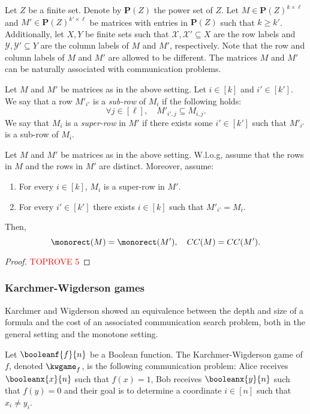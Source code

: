 \documentclass[acmsmall, nonacm, authorversion]{acmart}
\begin{document}
Let $Z$ be a finite set. Denote by $\mathbf{P}(Z)$ the power set of $Z$. Let $M\in \mathbf{P}(Z)^{k\times \ell}$ and $M'\in \mathbf{P}(Z)^{k'\times \ell}$ be matrices with entries in $\mathbf{P}(Z)$ such that $k\ge k'$. Additionally, let $X,Y$ be finite sets such that $\mathcal{X}, \mathcal{X}'\subseteq X$ are the row labels and $\mathcal{Y}, \mathcal{Y}'\subseteq Y$ are the column labels of $M$ and $M'$, respectively. Note that the row and column labels of $M$ and $M'$ are allowed to be different.
The matrices $M$ and $M'$ can be naturally associated with communication problems. 

\begin{definition}\label{def:sub-row-super-row}
Let $M$ and $M'$ be matrices as in the above setting. Let $i\in[k]$ and $i'\in[k']$. We say that a row $M'_{i'}$ is a \emph{sub-row} of $M_i$ if the following holds:
\[
\forall j\in [\ell], \quad M'_{i',j}\subseteq M_{i,j}.
\]
We say that $M_i$ is a \emph{super-row} in $M'$ if there exists some $i'\in[k']$ such that $M'_{i'}$ is a sub-row of $M_i$.
\end{definition}

\begin{lemma}\label{lem:simplification-lemma}
Let $M$ and $M'$ be matrices as in the above setting. W.l.o.g, assume that the rows in $M$ and the rows in $M'$ are distinct. Moreover, assume:
\begin{enumerate}
    \item For every $i\in[k]$, $M_i$ is a super-row in $M'$. \label{item:1}
    \item For every $i'\in [k']$ there exists $i\in [k]$ such that $M'_{i'}=M_{i}$. \label{item:2}
\end{enumerate}
Then, 
\[
\monorect(M)=\monorect(M'), \quad CC(M)=CC(M').
\]
\end{lemma}
\begin{proof}\textcolor{red}{TOPROVE 5}\end{proof}

\subsubsection{Karchmer-Wigderson games}\label{subsec:kw-games}
Karchmer and Wigderson \cite{KW90} showed an equivalence between the depth and size of a formula and the cost of an associated communication search problem, both in the general setting and the monotone setting.

\begin{definition}\label{def:classic-kw-game}
Let $\booleanf{f}{n}$ be a Boolean function. The Karchmer-Wigderson game of $f$, denoted $\kwgame_{f}$, is the following communication problem: Alice receives $\booleanx{x}{n}$ such that $f(x)=1$, Bob receives $\booleanx{y}{n}$ such that $f(y)=0$ and their goal is to determine a coordinate $i\in[n]$ such that $x_{i} \neq y_{i}$.
\end{definition}
\end{document}
